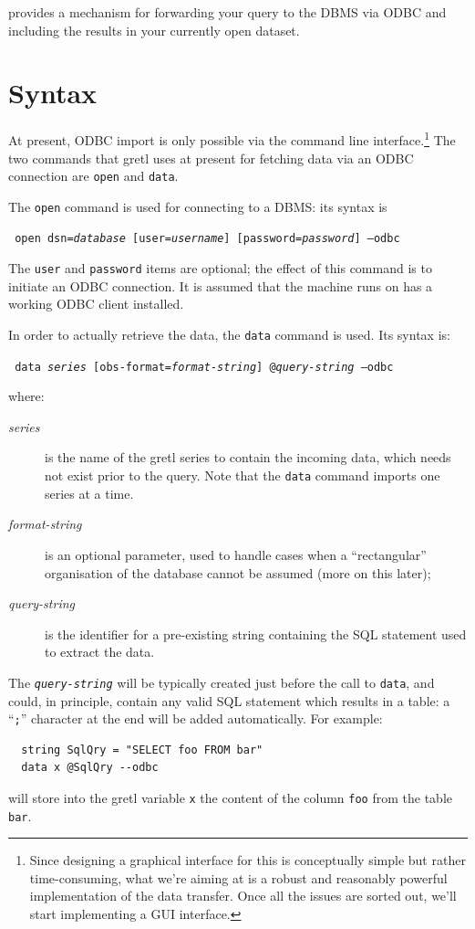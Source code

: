  provides a mechanism for forwarding your query to the DBMS
via ODBC and including the results in your currently open dataset.

\section{Syntax}
\label{sec:odbc-syntax}

At present, ODBC import is only possible via the command line
interface.\footnote{Since designing a graphical interface for this is
  conceptually simple but rather time-consuming, what we're aiming at
  is a robust and reasonably powerful implementation of the data
  transfer. Once all the issues are sorted out, we'll start
  implementing a GUI interface.} The two commands that gretl uses at
present for fetching data via an ODBC connection are \texttt{open} and
\texttt{data}.

The \texttt{open} command is used for connecting to a DBMS: its syntax
is
\begin{flushleft}
\texttt{%
  open dsn=\emph{database} [user=\emph{username}]
  [password=\emph{password}] --odbc
}
\end{flushleft}
The \texttt{user} and \texttt{password} items are optional; the effect
of this command is to initiate an ODBC connection. It is assumed that
the machine  runs on has a working ODBC client installed.

In order to actually retrieve the data, the \texttt{data} command is
used. Its syntax is:
\begin{flushleft}
\texttt{%
  data \emph{series} [obs-format=\emph{format-string}] @\emph{query-string} --odbc
}
\end{flushleft}
where:
\begin{description}
\item[\emph{series}] is the name of the gretl series to contain the
  incoming data, which needs not exist prior to the query. Note that
  the \texttt{data} command imports one series at a time.
\item[\emph{format-string}] is an optional parameter, used to handle
  cases when a ``rectangular'' organisation of the database cannot be
  assumed (more on this later);
\item[\emph{query-string}] is the identifier for a pre-existing string
  containing the SQL statement used to extract the data.
\end{description}

The \texttt{\emph{query-string}} will be typically created just before
the call to \texttt{data}, and could, in principle, contain any
valid SQL statement which results in a table: a ``\texttt{;}''
character at the end will be added automatically. For example:
\begin{verbatim}
  string SqlQry = "SELECT foo FROM bar"
  data x @SqlQry --odbc
\end{verbatim}
will store into the gretl variable \texttt{x} the content of the
column \texttt{foo} from the table \texttt{bar}.

